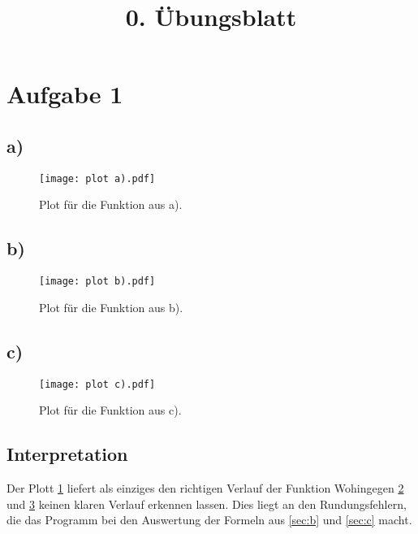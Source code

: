 


\title{0. Übungsblatt}



\maketitle
\thispagestyle{empty}
\newpage



\section{Aufgabe 1}
\subsection{a)}
\label{sec:1a}


\begin{figure}
  \centering
  \texttt{[image: plot a).pdf]}
  \caption{Plot für die Funktion aus a).}
  \label{fig:a}
\end{figure}

\subsection{b)}
\label{sec:1b}

\begin{figure}
  \centering
  \texttt{[image: plot b).pdf]}
  \caption{Plot für die Funktion aus b).}
  \label{fig:b}
\end{figure}
\FloatBarrier

\subsection{c)}
\label{sec:1c}

\begin{figure}
  \centering
  \texttt{[image: plot c).pdf]}
  \caption{Plot für die Funktion aus c).}
  \label{fig:c}
\end{figure}

\subsection{Interpretation}
Der Plott \ref{fig:a} liefert als einziges den richtigen Verlauf der Funktion
Wohingegen \ref{fig:b} und \ref{fig:c}  keinen klaren Verlauf erkennen lassen.
Dies liegt an den Rundungsfehlern, die das Programm
bei den Auswertung der Formeln aus \ref{sec:b} und \ref{sec:c} macht.

